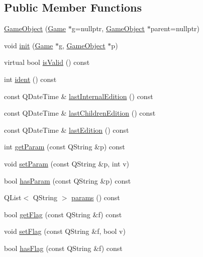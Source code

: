 \subsection*{Public Member Functions}
\begin{DoxyCompactItemize}
\item 
\hyperlink{class_game_object_ab00c537faf6eb4439c60003141a763b9}{Game\+Object} (\hyperlink{class_game}{Game} $\ast$g=nullptr, \hyperlink{class_game_object}{Game\+Object} $\ast$parent=nullptr)
\item 
void \hyperlink{class_game_object_a97be7b59b2e76e7d60de2146b894eed9}{init} (\hyperlink{class_game}{Game} $\ast$g, \hyperlink{class_game_object}{Game\+Object} $\ast$p)
\item 
virtual bool \hyperlink{class_game_object_a47fec909421c91c9a9cb5ef415d7cd23}{is\+Valid} () const
\item 
int \hyperlink{class_game_object_a5f4affc76982bc4a8487a3dff0c46502}{ident} () const
\item 
const Q\+Date\+Time \& \hyperlink{class_game_object_a76035507be4203cc72186f210a9c4fee}{last\+Internal\+Edition} () const
\item 
const Q\+Date\+Time \& \hyperlink{class_game_object_a83b0ea6d2c30edf0b70d3a9e2e80563b}{last\+Children\+Edition} () const
\item 
const Q\+Date\+Time \& \hyperlink{class_game_object_a060fb833acf28832fa85a7927227bdde}{last\+Edition} () const
\item 
int \hyperlink{class_game_object_a328ee07594f27b294fcac02099be393b}{get\+Param} (const Q\+String \&p) const
\item 
void \hyperlink{class_game_object_a28b8af7f399f1348a4f3130dd21173a1}{set\+Param} (const Q\+String \&p, int v)
\item 
bool \hyperlink{class_game_object_aefe5673b8484d485b418b0ba6a3314dd}{has\+Param} (const Q\+String \&p) const
\item 
Q\+List$<$ Q\+String $>$ \hyperlink{class_game_object_a5d42c482092a7dde84261ac466e815c8}{params} () const
\item 
bool \hyperlink{class_game_object_a16181f773a5685407bc3b314bb34ef71}{get\+Flag} (const Q\+String \&f) const
\item 
void \hyperlink{class_game_object_ae7984096fc518b15c0b080c543e4c42f}{set\+Flag} (const Q\+String \&f, bool v)
\item 
bool \hyperlink{class_game_object_aeab0a6261090e437f69dfde76a030904}{has\+Flag} (const Q\+String \&f) const
\item 

\end{DoxyCompactItemize}
